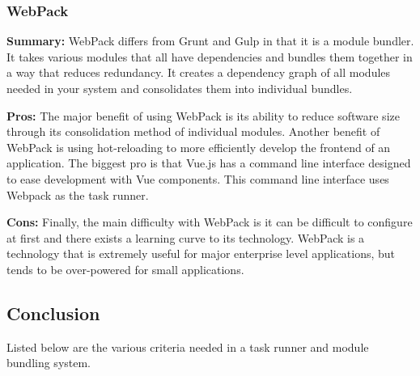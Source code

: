 \documentclass[draftclsnofoot,onecolumn,letterpaper,10pt,compsoc]{IEEEtran}
\begin{document}
  			\subsubsection{WebPack}
		        \textbf{Summary:}
		            WebPack differs from Grunt and Gulp in that it is a module bundler.
		            It takes various modules that all have dependencies and bundles them together in a way that reduces redundancy\cite{WebPack}.
		            It creates a dependency graph of all modules needed in your system and consolidates them into individual bundles\cite{WebPack}.

		        \noindent \textbf{Pros:}
		            The major benefit of using WebPack is its ability to reduce software size through its consolidation method of individual modules.
		            Another benefit of WebPack is using hot-reloading to more efficiently develop the frontend of an application\cite{TaskRunners}.
                The biggest pro is that Vue.js has a command line interface designed to ease development with Vue components.
                This command line interface uses Webpack as the task runner.

		        \noindent \textbf{Cons:}
		            Finally, the main difficulty with WebPack is it can be difficult to configure at first and there exists a learning curve to its technology\cite{TaskRunners}.
		            WebPack is a technology that is extremely useful for major enterprise level applications, but tends to be over-powered for small applications.

		    \subsection{Conclusion}
		        Listed below are the various criteria needed in a task runner and module bundling system.
\end{document}
